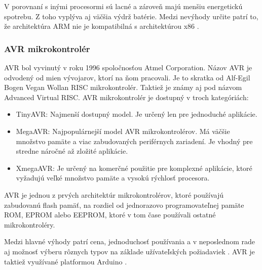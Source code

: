 V porovnaní s inými procesormi sú lacné a zároveň majú menšiu energetickú spotrebu. Z toho vyplýva aj väčšia výdrž batérie.
Medzi nevýhody určite patrí to, že architektúra ARM nie je kompatibilná s architektúrou x86 \cite{shidlingDifferentTypesMicrocontrollers2020}.

\subsubsection{AVR mikrokontrolér}
\noindent \par
AVR bol vyvinutý v roku 1996 spoločnosťou Atmel Corporation. Názov AVR je odvodený od mien vývojarov, ktorí na ňom pracovali.
Je to skratka od  Alf-Egil Bogen Vegan Wollan RISC mikrokontrolér.
Taktiež je známy aj pod názvom Advanced Virtual RISC. AVR mikrokontrolér je dostupný v troch kategóriách:
\begin{itemize}
    \item TinyAVR: Najmenší dostupný model. Je určený len pre jednoduché aplikácie.
    \item MegaAVR: Najpopulárnejší model AVR mikrokontrolérov. Má väčšie množstvo pamäte a viac zabudovaných periférnych zariadení. Je vhodný pre stredne náročné až zložité aplikácie.
    \item XmegaAVR: Je určený na komerčné použitie pre komplexné aplikácie, ktoré vyžadujú veľké množstvo pamäte a vysokú rýchlosť procesora.
\end{itemize}

AVR je jednou z prvých architektúr mikrokontrolérov, ktoré používajú zabudovanú flash pamäť, na rozdiel od jednorazovo programovateľnej pamäte ROM,  \acrshort{EPROM}  alebo  \acrshort{EEPROM}, ktoré v tom čase používali ostatné mikrokontroléry.
\par
Medzi hlavné výhody patrí cena, jednoduchosť používania a v neposlednom rade aj možnosť výberu rôznych typov na základe užívateľských požiadaviek \cite{shidlingDifferentTypesMicrocontrollers2020}. AVR je taktiež využívané platformou Arduino \cite{AVRVsArduinoWhich2017}.




